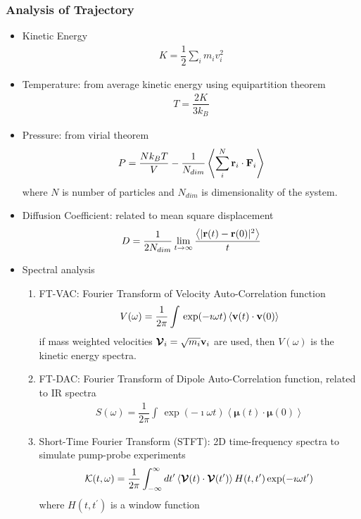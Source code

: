 \documentclass[slidestop,mathserif,compress,xcolor=svgnames]{beamer}
\begin{document}
\begin{frame}[allowframebreaks]
  \frametitle{\small Analysis of Trajectory}
  \begin{itemize}
  \item Kinetic Energy
    \begin{align*}
      K = \dfrac{1}{2}\sum_im_iv^2_i
    \end{align*}
  \item Temperature: from average kinetic energy using equipartition theorem
    \begin{align*}
      T = \dfrac{2K}{3k_B}
    \end{align*}
  \item Pressure: from virial theorem
    \begin{align*}
      P=\dfrac{Nk_BT}{V} -\dfrac{1}{N_{dim}}\left\langle\sum^N_i{\bf r}_i\cdot{\bf F}_i\right\rangle
    \end{align*}
    where $N$ is number of particles and $N_{dim}$ is dimensionality of the system.
  \item Diffusion Coefficient: related to mean square displacement
    \begin{align*}
      D = \dfrac{1}{2N_{dim}}\lim_{t\rightarrow\infty}\dfrac{\left\langle|{\bf r}(t) - {\bf r}(0)|^2\right\rangle}{t}
    \end{align*}
  \item Spectral analysis
    \begin{enumerate}
    \item FT-VAC: Fourier Transform of Velocity Auto-Correlation function
      \begin{align*}
        V(\omega) = \dfrac{1}{{2\pi}}\int\,\exp(-\imath\omega t)\left\langle{\bf v}(t)\cdot{\bf v}(0)\right\rangle
      \end{align*}
      if mass weighted velocities $\boldsymbol{\cal V}_i=\sqrt{m_i}{\bf v}_i$ are used, then $V(\omega)$ is the kinetic energy spectra.
    \item FT-DAC: Fourier Transform of Dipole Auto-Correlation function, related to IR spectra
      \begin{align*}
        S(\omega) = \dfrac{1}{{2\pi}}\int\,\exp(-\imath\omega t)\left\langle{\boldsymbol \mu}(t)\cdot{\boldsymbol \mu}(0)\right\rangle
      \end{align*}
    \item Short-Time Fourier Transform (STFT): 2D time-frequency spectra to simulate pump-probe experiments 
      \begin{align*}
        {\cal K}(t,\omega) = \frac{1}{2\pi}\int^{\infty}_{-\infty}dt^\prime
        \left\langle{\boldsymbol{\cal V}}(t)\cdot{\boldsymbol{\cal V}}(t^\prime)\right\rangle
        H(t,t^\prime)\exp(-\imath\omega t^\prime)\label{eq:stft-vac}
      \end{align*}
      where %
      $H(t,t^\prime)$ is a window function
    \end{enumerate}
  \end{itemize}
\end{frame}
\end{document}
